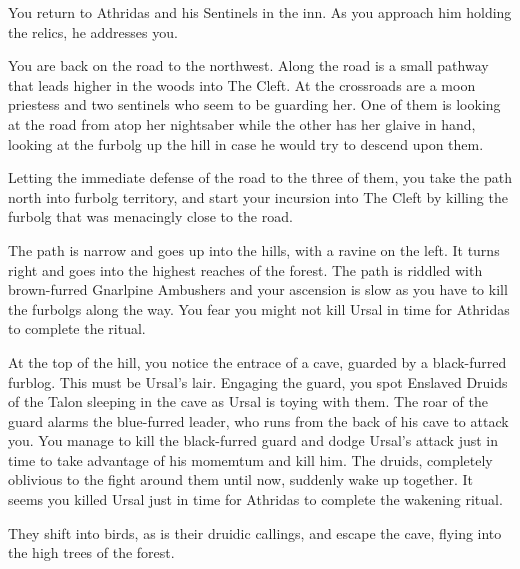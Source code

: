 You return to Athridas and his Sentinels in the inn. As you approach him holding the relics, he addresses you.




You are back on the road to the northwest. Along the road is a small pathway that leads higher in the woods into The Cleft. At the crossroads are a moon priestess and two sentinels who seem to be guarding her. One of them is looking at the road from atop her nightsaber while the other has her glaive in hand, looking at the furbolg up the hill in case he would try to descend upon them.



Letting the immediate defense of the road to the three of them, you take the path north into furbolg territory, and start your incursion into The Cleft by killing the furbolg that was menacingly close to the road.

The path is narrow and goes up into the hills, with a ravine on the left. It turns right and goes into the highest reaches of the forest. The path is riddled with brown-furred Gnarlpine Ambushers and your ascension is slow as you have to kill the furbolgs along the way. You fear you might not kill Ursal in time for Athridas to complete the ritual.

At the top of the hill, you notice the entrace of a cave, guarded by a black-furred furblog. This must be Ursal's lair. Engaging the guard, you spot Enslaved Druids of the Talon sleeping in the cave as Ursal is toying with them. The roar of the guard alarms the blue-furred leader, who runs from the back of his cave to attack you. You manage to kill the black-furred guard and dodge Ursal's attack just in time to take advantage of his momemtum and kill him. The druids, completely oblivious to the fight around them until now, suddenly wake up together. It seems you killed Ursal just in time for Athridas to complete the wakening ritual.


They shift into birds, as is their druidic callings, and escape the cave, flying into the high trees of the forest.

